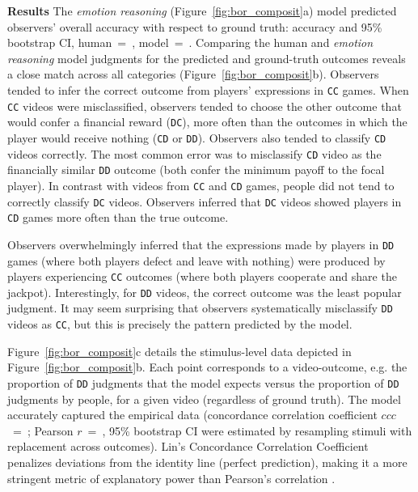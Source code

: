 \documentclass[10pt,letterpaper]{article}
\newcommand{\CC}{\texttt{CC}\xspace}
\newcommand{\CD}{\texttt{CD}\xspace}
\newcommand{\DC}{\texttt{DC}\xspace}
\newcommand{\DD}{\texttt{DD}\xspace}
\begin{document}
\vspace{1 mm}
\noindent\textbf{Results}
The {\em emotion reasoning} (Figure~\ref{fig:bor_composit}a) model predicted observers' overall accuracy with respect to ground truth: accuracy and 95\% bootstrap CI, human~=~, model~=~.
Comparing the human and {\em emotion reasoning} model judgments for the predicted and ground-truth outcomes reveals a close match across all categories (Figure~\ref{fig:bor_composit}b). 
Observers tended to infer the correct outcome from players' expressions in \CC games. 
When \CC videos were misclassified, observers tended to choose the other outcome that would confer a financial reward (\DC), more often than the outcomes in which the player would receive nothing (\CD or \DD). Observers also tended to classify \CD videos correctly. The most common error was to misclassify \CD video as the financially similar \DD outcome (both confer the minimum payoff to the focal player).
In contrast with videos from \CC and \CD games, people did not tend to correctly classify \DC videos. Observers inferred that \DC videos showed players in \CD games more often than the true outcome. 

Observers overwhelmingly inferred that the expressions made by players in \DD games (where both players defect and leave with nothing) were produced by players experiencing \CC outcomes (where both players cooperate and share the jackpot). 
Interestingly, for \DD videos, the correct outcome was the least popular judgment. It may seem surprising that observers systematically misclassify \DD videos as \CC, but this is precisely the pattern predicted by the model.


Figure~\ref{fig:bor_composit}c details the stimulus-level data depicted in Figure~\ref{fig:bor_composit}b. Each point corresponds to a video-outcome, e.g. the proportion of \DD judgments that the model expects versus the proportion of \DD judgments by people, for a given video (regardless of ground truth). The model accurately captured the empirical data (concordance correlation coefficient $ccc$~=~; Pearson $r$~=~, 95\% bootstrap CI were estimated by resampling stimuli with replacement across outcomes). 
Lin's Concordance Correlation Coefficient penalizes deviations from the identity line (perfect prediction), making it a more stringent metric of explanatory power than Pearson's correlation \citep{lin1989concordance}.
\end{document}
